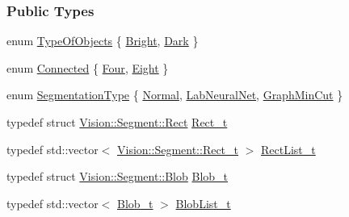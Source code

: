 \subsubsection*{Public Types}
\begin{DoxyCompactItemize}
\item 
enum \hyperlink{class_vision_1_1_segment_ac3ddf2c72ee6333007510b680db1e7dd}{Type\+Of\+Objects} \{ \hyperlink{class_vision_1_1_segment_ac3ddf2c72ee6333007510b680db1e7ddad37a09a08a5a4fdf88cb15f21e5ff28b}{Bright}, 
\hyperlink{class_vision_1_1_segment_ac3ddf2c72ee6333007510b680db1e7dda962a0c0955809f63df036dbd41824c54}{Dark}
 \}
\item 
enum \hyperlink{class_vision_1_1_segment_a330240c08320e72270fac0aa83d5e27e}{Connected} \{ \hyperlink{class_vision_1_1_segment_a330240c08320e72270fac0aa83d5e27ea1fca5ab1c285c0edd2bdc3072cab0c01}{Four}, 
\hyperlink{class_vision_1_1_segment_a330240c08320e72270fac0aa83d5e27eae8e2b0fa6d15448f10cddc0390284a39}{Eight}
 \}
\item 
enum \hyperlink{class_vision_1_1_segment_af3a2b992526eac54bca53e34cf2db4da}{Segmentation\+Type} \{ \hyperlink{class_vision_1_1_segment_af3a2b992526eac54bca53e34cf2db4daae000cfc8d629752d6cdbba0d3d750184}{Normal}, 
\hyperlink{class_vision_1_1_segment_af3a2b992526eac54bca53e34cf2db4daa6ddef558061ee58899a362608a5b163b}{Lab\+Neural\+Net}, 
\hyperlink{class_vision_1_1_segment_af3a2b992526eac54bca53e34cf2db4daa0291c0ff93e52e8e78f86698b0288353}{Graph\+Min\+Cut}
 \}
\item 
typedef struct \hyperlink{struct_vision_1_1_segment_1_1_rect}{Vision\+::\+Segment\+::\+Rect} \hyperlink{class_vision_1_1_segment_af9428422a82edaab8a1e5ba59acc8c16}{Rect\+\_\+t}
\item 
typedef std\+::vector$<$ \hyperlink{class_vision_1_1_segment_af9428422a82edaab8a1e5ba59acc8c16}{Vision\+::\+Segment\+::\+Rect\+\_\+t} $>$ \hyperlink{class_vision_1_1_segment_aaaa7a3b37f6fa4402bc1309e9bf74bec}{Rect\+List\+\_\+t}
\item 
typedef struct \hyperlink{struct_vision_1_1_segment_1_1_blob}{Vision\+::\+Segment\+::\+Blob} \hyperlink{class_vision_1_1_segment_add6c81230e499b159218c5232e3b76ae}{Blob\+\_\+t}
\item 
typedef std\+::vector$<$ \hyperlink{class_vision_1_1_segment_add6c81230e499b159218c5232e3b76ae}{Blob\+\_\+t} $>$ \hyperlink{class_vision_1_1_segment_a60e08251e2ab94239e245044c31cde51}{Blob\+List\+\_\+t}
\end{DoxyCompactItemize}
